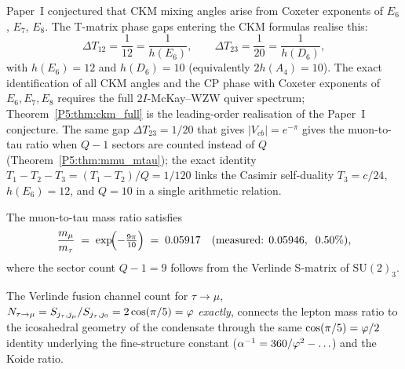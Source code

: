 \begin{remark}
\label{P5:rem:coxeter_connection}
Paper~I conjectured that CKM mixing angles arise from Coxeter exponents
of $E_6$, $E_7$, $E_8$. The T-matrix phase gaps entering the CKM
formulas realise this:
\begin{equation}
  \Delta T_{12} = \frac{1}{12} = \frac{1}{h(E_6)},
  \qquad
  \Delta T_{23} = \frac{1}{20} = \frac{1}{h(D_6)},
  \label{P5:eq:coxeter_connection}
\end{equation}
with $h(E_6)=12$ and $h(D_6)=10$ (equivalently $2h(A_4)=10$). The exact
identification of all CKM angles and the CP phase with Coxeter
exponents of $E_6,E_7,E_8$ requires the full $2I$-McKay--WZW quiver
spectrum; Theorem~\ref{P5:thm:ckm_full} is the leading-order realisation
of the Paper~I conjecture. The same gap $\Delta T_{23}=1/20$ that gives
$|V_{cb}|=e^{-\pi}$ gives the muon-to-tau ratio when $Q-1$ sectors are
counted instead of $Q$ (Theorem~\ref{P5:thm:mmu_mtau}); the exact identity
$T_1-T_2-T_3=(T_1-T_2)/Q=1/120$ links the Casimir self-duality
$T_3=c/24$, $h(E_6)=12$, and $Q=10$ in a single arithmetic relation.
\end{remark}

\begin{theorem}
\label{P5:thm:mmu_mtau}
The muon-to-tau mass ratio satisfies
\begin{equation}
  \frac{m_\mu}{m_\tau}
  \;=\; \exp\!\Bigl(-\tfrac{9\pi}{10}\Bigr)
  \;=\; 0.05917
  \quad(\text{measured: }0.05946,\;\;0.50\%),
  \label{P5:eq:mmu_mtau_proved}
\end{equation}
where the sector count $Q-1=9$ follows from the Verlinde S-matrix of $\mathrm{SU}(2)_3$.
\end{theorem}

\begin{remark}[Verlinde count $N_{\tau\to\mu}=\vp$ and icosahedral geometry]
\label{P5:rem:verlinde_phi}
The Verlinde fusion channel count for $\tau\to\mu$,
$N_{\tau\to\mu}=S_{j_\tau,j_\mu}/S_{j_\tau,j_0}=2\cos(\pi/5)=\varphi$
\emph{exactly}, connects the lepton mass ratio to the icosahedral
geometry of the condensate through the same $\cos(\pi/5)=\varphi/2$
identity underlying the fine-structure constant
($\alpha^{-1}=360/\varphi^2-\ldots$) and the Koide ratio.
\end{remark}

